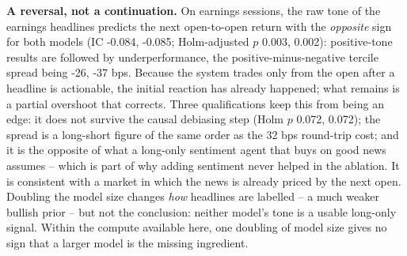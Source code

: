 \documentclass[11pt,a4paper]{article}
\begin{document}
\textbf{A reversal, not a continuation.} On earnings sessions, the raw tone of the earnings headlines predicts the next open-to-open return with the \emph{opposite} sign for both models (IC -0.084, -0.085; Holm-adjusted $p$ 0.003, 0.002): positive-tone results are followed by underperformance, the positive-minus-negative tercile spread being -26, -37 bps. Because the system trades only from the open after a headline is actionable, the initial reaction has already happened; what remains is a partial overshoot that corrects. Three qualifications keep this from being an edge: it does not survive the causal debiasing step (Holm $p$ 0.072, 0.072); the spread is a long-short figure of the same order as the 32 bps round-trip cost; and it is the opposite of what a long-only sentiment agent that buys on good news assumes -- which is part of why adding sentiment never helped in the ablation. It is consistent with a market in which the news is already priced by the next open.
Doubling the model size changes \emph{how} headlines are labelled -- a much weaker bullish prior -- but not the conclusion: neither model's tone is a usable long-only signal. Within the compute available here, one doubling of model size gives no sign that a larger model is the missing ingredient.
\end{document}

